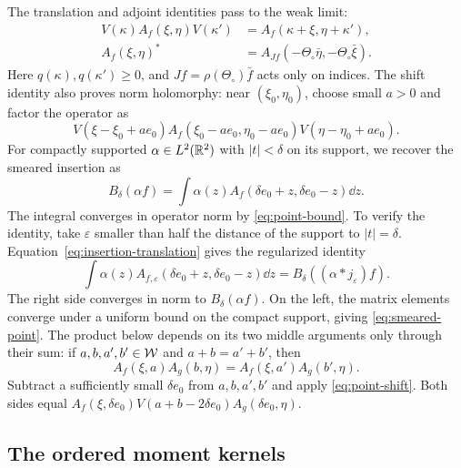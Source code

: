 The translation and adjoint identities pass to the weak limit:
\begin{align}
 V(\kappa)A_f(\xi,\eta)V(\kappa')
   &=A_f(\kappa+\xi,\eta+\kappa'),\label{eq:point-shift}\\
 A_f(\xi,\eta)^*&=A_{Jf}(-\Theta_\circ\bar\eta,
                                      -\Theta_\circ\bar\xi).
 \label{eq:point-adjoint}
\end{align}
Here $q(\kappa),q(\kappa')\geq0$, and $Jf=\rho(\Theta_\circ)\bar f$
acts only on indices. The shift identity also proves norm holomorphy:
near $(\xi_0,\eta_0)$, choose small $a>0$ and factor the operator as
\begin{equation}
 V(\xi-\xi_0+ae_0)A_f(\xi_0-ae_0,\eta_0-ae_0)
          V(\eta-\eta_0+ae_0).
\end{equation}
For compactly supported $\alpha\in L^2(\mathbb{R}^2)$ with $|t|<\delta$
on its support, we recover the smeared insertion as
\begin{equation}\label{eq:smeared-point}
 B_\delta(\alpha f)=\int\alpha(z)
               A_f(\delta e_0+z,\delta e_0-z)\dd z.
\end{equation}
The integral converges in operator norm by \eqref{eq:point-bound}.
To verify the identity, take $\varepsilon$ smaller than half the distance
of the support to $|t|=\delta$. Equation~\eqref{eq:insertion-translation}
gives the regularized identity
\begin{equation}
 \int\alpha(z)A_{f,\varepsilon}(\delta e_0+z,\delta e_0-z)\dd z
       =B_\delta((\alpha*j_\varepsilon)f).
\end{equation}
The right side converges in norm to $B_\delta(\alpha f)$.
On the left, the matrix elements converge under a uniform bound
on the compact support, giving \eqref{eq:smeared-point}.
The product below depends on its two middle arguments only through
their sum: if $a,b,a',b'\in\mathcal{W}$ and $a+b=a'+b'$, then
\begin{equation}\label{eq:gap-splitting}
 A_f(\xi,a)A_g(b,\eta)=A_f(\xi,a')A_g(b',\eta).
\end{equation}
Subtract a sufficiently small $\delta e_0$ from $a,b,a',b'$
and apply \eqref{eq:point-shift}. Both sides equal
$A_f(\xi,\delta e_0)V(a+b-2\delta e_0)A_g(\delta e_0,\eta)$.

\subsection{The ordered moment kernels}\label{subsec:ordered}

